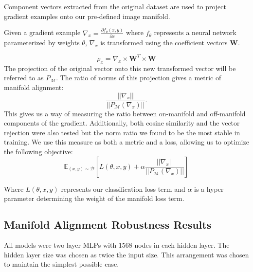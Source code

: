 Component vectors extracted from the original dataset are used to project gradient examples onto our pre-defined image manifold.

Given a gradient example $\nabla_x = \frac{\partial f_\theta(x, y)}{\partial x}$ where $f_\theta$ represents a neural network parameterized by weights $\theta$, $\nabla_x$ is transformed using the coefficient vectors \textbf{W}.

\begin{equation}
    \rho_x = \nabla_x \times \textbf{W}^T \times \textbf{W}    
\end{equation}
The projection of the original vector onto this new transformed vector
will be referred to as $P_{\mathcal{M}}$.
The ratio of norms of this projection gives a metric of manifold alignment:
\begin{equation}
    \frac{|| \nabla_x || }{||P_{\mathcal{M}}(\nabla_x )||}.
  \label{equ:ratio}
\end{equation}
This gives us a way of measuring the ratio between on-manifold and off-manifold components of the gradient.
Additionally, both cosine similarity and the vector rejection were also tested but the norm ratio we found to be the most stable in training.
We use this measure as both a metric and a loss, allowing us to optimize the following objective:
\begin{equation}
  \mathds{E}_{(x,y) \sim \mathcal{D}} \left[ L(\theta, x,y)  + \alpha \frac{|| \nabla_x || }{||P_{\mathcal{M}}(\nabla_x )||} \right]
  \label{equ:loss}
\end{equation}

Where $L(\theta, x, y)$ represents our classification loss term and $\alpha$ is a hyper parameter determining the weight of the manifold loss term.

\subsection{Manifold Alignment Robustness Results}

All models were two layer MLPs with 1568 nodes in each hidden layer.
The hidden layer size was chosen as twice the input size.
This arrangement was chosen to maintain the simplest possible case.

